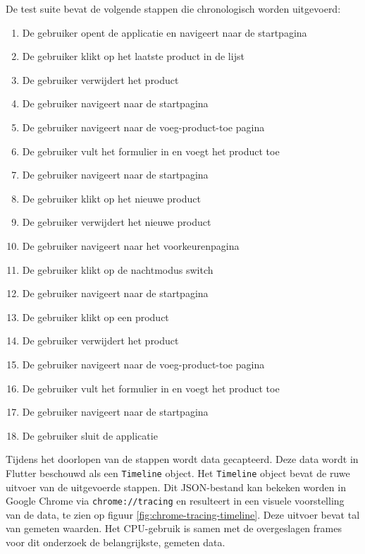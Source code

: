 De test suite bevat de volgende stappen die chronologisch worden uitgevoerd:
\begin{enumerate}
    \item De gebruiker opent de applicatie en navigeert naar de startpagina
    \item De gebruiker klikt op het laatste product in de lijst
    \item De gebruiker verwijdert het product
    \item De gebruiker navigeert naar de startpagina
    \item De gebruiker navigeert naar de voeg-product-toe pagina
    \item De gebruiker vult het formulier in en voegt het product toe
    \item De gebruiker navigeert naar de startpagina
    \item De gebruiker klikt op het nieuwe product
    \item De gebruiker verwijdert het nieuwe product
    \item De gebruiker navigeert naar het voorkeurenpagina
    \item De gebruiker klikt op de nachtmodus switch
    \item De gebruiker navigeert naar de startpagina
    \item De gebruiker klikt op een product
    \item De gebruiker verwijdert het product
    \item De gebruiker navigeert naar de voeg-product-toe pagina
    \item De gebruiker vult het formulier in en voegt het product toe
    \item De gebruiker navigeert naar de startpagina
    \item De gebruiker sluit de applicatie
\end{enumerate}


Tijdens het doorlopen van de stappen wordt data gecapteerd. Deze data wordt in Flutter beschouwd als een \verb|Timeline| object. Het \verb|Timeline| object bevat de ruwe uitvoer van de uitgevoerde stappen. Dit JSON-bestand kan bekeken worden in Google Chrome via \verb|chrome://tracing| en resulteert in een visuele voorstelling van de data, te zien op figuur \ref{fig:chrome-tracing-timeline}. Deze uitvoer bevat tal van gemeten waarden. Het CPU-gebruik is samen met de overgeslagen frames voor dit onderzoek de belangrijkste, gemeten data. \newline

